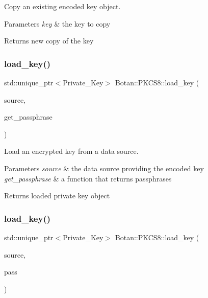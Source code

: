 Copy an existing encoded key object. 
\begin{DoxyParams}{Parameters}
{\em key} & the key to copy \\
\hline
\end{DoxyParams}
\begin{DoxyReturn}{Returns}
new copy of the key 
\end{DoxyReturn}
\mbox{\label{namespace_botan_1_1_p_k_c_s8_a2eb85270cb50784297d53959fca2dac6}} 
\subsubsection{\texorpdfstring{load\+\_\+key()}{load\_key()}\hspace{0.1cm}{\footnotesize\ttfamily [1/3]}}
{\footnotesize\ttfamily std\+::unique\+\_\+ptr$<$Private\+\_\+\+Key$>$ Botan\+::\+P\+K\+C\+S8\+::load\+\_\+key (\begin{DoxyParamCaption}\item[{Data\+Source \&}]{source,  }\item[{std\+::function$<$ std\+::string()$>$}]{get\+\_\+passphrase }\end{DoxyParamCaption})}

Load an encrypted key from a data source. 
\begin{DoxyParams}{Parameters}
{\em source} & the data source providing the encoded key \\
\hline
{\em get\+\_\+passphrase} & a function that returns passphrases \\
\hline
\end{DoxyParams}
\begin{DoxyReturn}{Returns}
loaded private key object 
\end{DoxyReturn}
\mbox{\label{namespace_botan_1_1_p_k_c_s8_aeee3a469770fe03a5b95b0fbe0423b41}} 
\subsubsection{\texorpdfstring{load\+\_\+key()}{load\_key()}\hspace{0.1cm}{\footnotesize\ttfamily [2/3]}}
{\footnotesize\ttfamily std\+::unique\+\_\+ptr$<$Private\+\_\+\+Key$>$ Botan\+::\+P\+K\+C\+S8\+::load\+\_\+key (\begin{DoxyParamCaption}\item[{Data\+Source \&}]{source,  }\item[{const std\+::string \&}]{pass }\end{DoxyParamCaption})}

